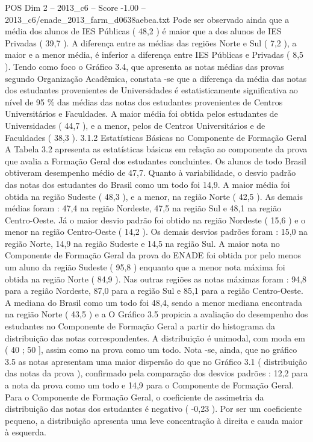 \begin{textsample}{POS Dim 2 – 2013\_c6 – Score -1.00 – 2013\_c6/enade\_2013\_farm\_d0638aebea.txt}
Pode ser observado ainda que a média dos alunos de IES Públicas ( 48,2 ) é maior que a dos alunos de IES Privadas ( 39,7 ).
A diferença entre as médias das regiões Norte e Sul ( 7,2 ), a maior e a menor média, é inferior a diferença entre IES Públicas e Privadas ( 8,5 ).
Tendo como foco o Gráfico 3.4, que apresenta as notas médias das provas segundo Organização Acadêmica, constata -se que a diferença da média das notas dos estudantes provenientes de Universidades é estatisticamente significativa ao nível de 95 \% das médias das notas dos estudantes provenientes de Centros Universitários e Faculdades.
A maior média foi obtida pelos estudantes de Universidades ( 44,7 ), e a menor, pelos de Centros Universitários e de Faculdades ( 38,3 ). 3.1.2 Estatísticas Básicas no Componente de Formação Geral A Tabela 3.2 apresenta as estatísticas básicas em relação ao componente da prova que avalia a Formação Geral dos estudantes concluintes.
Os alunos de todo Brasil obtiveram desempenho médio de 47,7.
Quanto à variabilidade, o desvio padrão das notas dos estudantes do Brasil como um todo foi 14,9.
A maior média foi obtida na região Sudeste ( 48,3 ), e a menor, na região Norte ( 42,5 ).
As demais médias foram : 47,4 na região Nordeste, 47,5 na região Sul e 48,1 na região Centro-Oeste.
Já o maior desvio padrão foi obtido na região Nordeste ( 15,6 ) e o menor na região Centro-Oeste ( 14,2 ).
Os demais desvios padrões foram : 15,0 na região Norte, 14,9 na região Sudeste e 14,5 na região Sul.
A maior nota no Componente de Formação Geral da prova do ENADE foi obtida por pelo menos um aluno da região Sudeste ( 95,8 ) enquanto que a menor nota máxima foi obtida na região Norte ( 84,9 ).
Nas outras regiões as notas máximas foram : 94,8 para a região Nordeste, 87,0 para a região Sul e 85,1 para a região Centro-Oeste.
A mediana do Brasil como um todo foi 48,4, sendo a menor mediana encontrada na região Norte ( 43,5 ) e a O Gráfico 3.5 propicia a avaliação do desempenho dos estudantes no Componente de Formação Geral a partir do histograma da distribuição das notas correspondentes.
A distribuição é unimodal, com moda em ( 40 ; 50 ], assim como na prova como um todo.
Nota -se, ainda, que no gráfico 3.5 as notas apresentam uma maior dispersão do que no Gráfico 3.1 ( distribuição das notas da prova ), confirmado pela comparação dos desvios padrões : 12,2 para a nota da prova como um todo e 14,9 para o Componente de Formação Geral.
Para o Componente de Formação Geral, o coeficiente de assimetria da distribuição das notas dos estudantes é negativo ( -0,23 ).
Por ser um coeficiente pequeno, a distribuição apresenta uma leve concentração à direita e cauda maior à esquerda.

\end{textsample}
